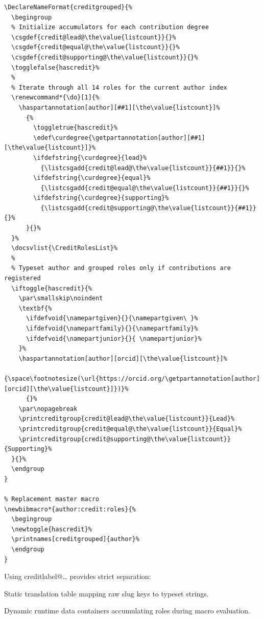 \documentclass[12pt, twoside]{article}
\begin{document}
\begin{lstlisting}[style=latexExampleForAuthors, escapechar=|, basicstyle=\footnotesize, caption={{Listing CReDiT roles grouped by degree}}, label=lst:biberCReDiTrolesGroupedByDegree]
% Grouped synthesis name-formatting driver
\DeclareNameFormat{creditgrouped}{%
  \begingroup
  % Initialize accumulators for each contribution degree
  \csgdef{credit@lead@\the\value{listcount}}{}%
  \csgdef{credit@equal@\the\value{listcount}}{}%
  \csgdef{credit@supporting@\the\value{listcount}}{}%
  \togglefalse{hascredit}%
  %
  % Iterate through all 14 roles for the current author index
  \renewcommand*{\do}[1]{%
    \haspartannotation[author][##1][\the\value{listcount}]%
      {%
        \toggletrue{hascredit}%
        \edef\curdegree{\getpartannotation[author][##1][\the\value{listcount}]}%
        \ifdefstring{\curdegree}{lead}%
          {\listcsgadd{credit@lead@\the\value{listcount}}{##1}}{}%
        \ifdefstring{\curdegree}{equal}%
          {\listcsgadd{credit@equal@\the\value{listcount}}{##1}}{}%
        \ifdefstring{\curdegree}{supporting}%
          {\listcsgadd{credit@supporting@\the\value{listcount}}{##1}}{}%
      }{}%
  }%
  \docsvlist{\CreditRolesList}%
  %
  % Typeset author and grouped roles only if contributions are registered
  \iftoggle{hascredit}{%
    \par\smallskip\noindent
    \textbf{%
      \ifdefvoid{\namepartgiven}{}{\namepartgiven\ }%
      \ifdefvoid{\namepartfamily}{}{\namepartfamily}%
      \ifdefvoid{\namepartjunior}{}{ \namepartjunior}%
    }%
    \haspartannotation[author][orcid][\the\value{listcount}]%
      {\space\footnotesize(\url{https://orcid.org/\getpartannotation[author][orcid][\the\value{listcount}]})}%
      {}%
    \par\nopagebreak
    \printcreditgroup{credit@lead@\the\value{listcount}}{Lead}%
    \printcreditgroup{credit@equal@\the\value{listcount}}{Equal}%
    \printcreditgroup{credit@supporting@\the\value{listcount}}{Supporting}%
  }{}%
  \endgroup
}

% Replacement master macro
\newbibmacro*{author:credit:roles}{%
  \begingroup
  \newtoggle{hascredit}%
  \printnames[creditgrouped]{author}%
  \endgroup
}
\end{lstlisting}

Using creditlabel@\ldots{} provides strict separation:
\begin{description}[labelwidth =\widthof{\textbf{\texttt{credit@<degree>@<author\_idx>}}}, leftmargin = !]
    \item[\texttt{creditlabel@<role>}] Static translation table mapping raw slug keys to typeset strings.

    \item[\texttt{credit@<degree>@<author\_idx>}] Dynamic runtime data containers accumulating roles during macro evaluation.
\end{description}
\end{document}
